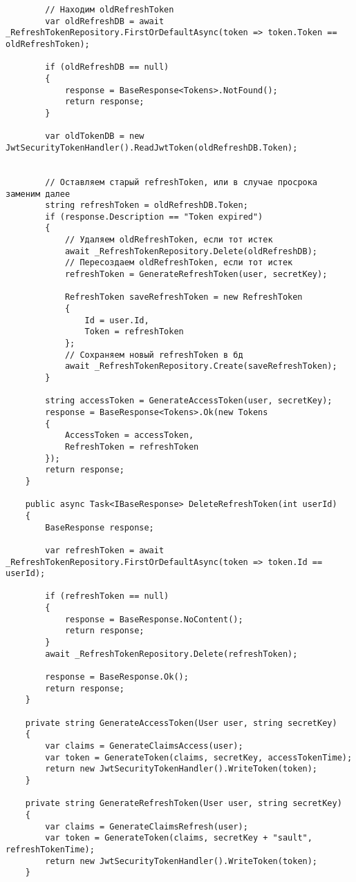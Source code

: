 \begin{verbatim}
        // Находим oldRefreshToken
        var oldRefreshDB = await _RefreshTokenRepository.FirstOrDefaultAsync(token => token.Token == oldRefreshToken);

        if (oldRefreshDB == null)
        {
            response = BaseResponse<Tokens>.NotFound();
            return response;
        }

        var oldTokenDB = new JwtSecurityTokenHandler().ReadJwtToken(oldRefreshDB.Token);


        // Оставляем старый refreshToken, или в случае просрока заменим далее
        string refreshToken = oldRefreshDB.Token;
        if (response.Description == "Token expired")
        {
            // Удаляем oldRefreshToken, если тот истек
            await _RefreshTokenRepository.Delete(oldRefreshDB);
            // Пересоздаем oldRefreshToken, если тот истек
            refreshToken = GenerateRefreshToken(user, secretKey);

            RefreshToken saveRefreshToken = new RefreshToken
            {
                Id = user.Id,
                Token = refreshToken
            };
            // Сохраняем новый refreshToken в бд
            await _RefreshTokenRepository.Create(saveRefreshToken);
        }

        string accessToken = GenerateAccessToken(user, secretKey);
        response = BaseResponse<Tokens>.Ok(new Tokens
        {
            AccessToken = accessToken,
            RefreshToken = refreshToken
        });
        return response;
    }

    public async Task<IBaseResponse> DeleteRefreshToken(int userId)
    {
        BaseResponse response;

        var refreshToken = await _RefreshTokenRepository.FirstOrDefaultAsync(token => token.Id == userId);

        if (refreshToken == null)
        {
            response = BaseResponse.NoContent();
            return response;
        }
        await _RefreshTokenRepository.Delete(refreshToken);

        response = BaseResponse.Ok();
        return response;
    }

    private string GenerateAccessToken(User user, string secretKey)
    {
        var claims = GenerateClaimsAccess(user);
        var token = GenerateToken(claims, secretKey, accessTokenTime);
        return new JwtSecurityTokenHandler().WriteToken(token);
    }

    private string GenerateRefreshToken(User user, string secretKey)
    {
        var claims = GenerateClaimsRefresh(user);
        var token = GenerateToken(claims, secretKey + "sault", refreshTokenTime);
        return new JwtSecurityTokenHandler().WriteToken(token);
    }


\end{verbatim}
